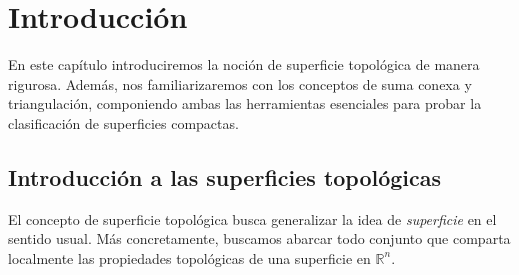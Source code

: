 \documentclass[a4paper,11pt,spanish, twoside, leqno]{tfg-uam}
\theoremstyle{definition}
\begin{document}
\begin{abstract}[english]
This essay contains a mathematical approach to topological surfaces and their classification:

Firstly, basic notions of compact surfaces will be introduced, from which a proof of their classification will be given. As a result we will find that any compact surface is homeomorphic either to: a sphere, or a  finite \textit{connected sum} of torus, or a finite \textit{connected sum} of projective planes.

Afterwards, we will proceed to study the Kerékjártó's theorem, the classification without the hypothesis of compactness. For this, we will require to introduce the concept of ideal boundary, a topological invariant that describes how a surface is divided by its compact subsurfaces. The theorem will guarantee that, with a `genus' and `orientability class', a surface will be topologically determined by its ideal boundary.

Furthermore, we will give a representative for each equivalence class of the classification. A topological result will prove that any ideal boundary is homeomorphic to a subset of the Cantor set. Evenmore, a construction by Ian Richards will prove that given any subset of the Cantor set one can construct a surface that has it as ideal boundary. This construction will allows us to present such representatives. Lastly, we will briefly discuss the numerability of homeomorphic surfaces.
\end{abstract}





\mainmatter
\chapter{Introducción}
En este capítulo introduciremos la noción de superficie topológica de manera rigurosa. Además, nos familiarizaremos con los conceptos de suma conexa y triangulación, componiendo ambas las herramientas esenciales para probar la clasificación de superficies compactas.
\section{Introducci\'on a las superficies topológicas}
El concepto de superficie topológica busca generalizar la idea de \textit{superficie} en el sentido usual. Más concretamente, buscamos abarcar todo conjunto que comparta localmente las propiedades topológicas de una superficie en $\mathbb{R}^n$. 
\end{document}
